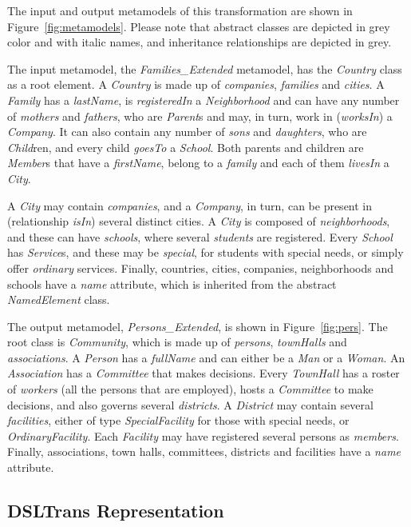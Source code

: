 The input and output metamodels of this transformation are shown in Figure~\ref{fig:metamodels}. Please note that abstract classes are depicted in grey color and with italic names, and inheritance relationships are depicted in grey.

The input metamodel, the \emph{Families\_Extended} metamodel, has the \emph{Country} class as a root element.
A \emph{Country} is made up of \emph{companies}, \emph{families} and \emph{cities}.
A \emph{Family} has a \emph{lastName}, is \emph{registeredIn} a \emph{Neighborhood} and can have any number of \emph{mothers} and \emph{fathers}, who are \emph{Parent}s and may, in turn, work in (\emph{worksIn}) a \emph{Company}.
It can also contain any number of \emph{sons} and \emph{daughters}, who are \emph{Child}ren, and every child \emph{goesTo} a \emph{School}.
Both parents and children are \emph{Member}s that have a \emph{firstName}, belong to a \emph{family} and each of them \emph{livesIn} a \emph{City}.

A \emph{City} may contain \emph{companies}, and a \emph{Company}, in turn, can be present in (relationship \emph{isIn}) several distinct cities.
A \emph{City} is composed of \emph{neighborhoods}, and these can have \emph{schools}, where several \emph{students} are registered.
Every \emph{School} has \emph{Service}s, and these may be \emph{special}, for students with special needs, or simply offer \emph{ordinary} services.
Finally, countries, cities, companies, neighborhoods and schools have a \emph{name} attribute, which is inherited from the abstract \emph{NamedElement} class.

The output metamodel, \emph{Persons\_Extended}, is shown in Figure~\ref{fig:pers}.
The root class is \emph{Community}, which is made up of \emph{persons}, \emph{townHalls} and \emph{associations}.
A \emph{Person} has a \emph{fullName} and can either be a \emph{Man} or a \emph{Woman}.
An \emph{Association} has a \emph{Committee} that makes decisions.
Every \emph{TownHall} has a roster of \emph{workers} (all the persons that are employed), hosts a \emph{Committee} to make decisions, and also governs several \emph{districts}.
A \emph{District} may contain several \emph{facilities}, either of type \emph{SpecialFacility} for those with special needs, or \emph{OrdinaryFacility}.
Each \emph{Facility} may have registered several persons as \emph{members}.
Finally, associations, town halls, committees, districts and facilities have a \emph{name} attribute.


\subsection{DSLTrans Representation}\label{sec:DSLTransRepresentation}

